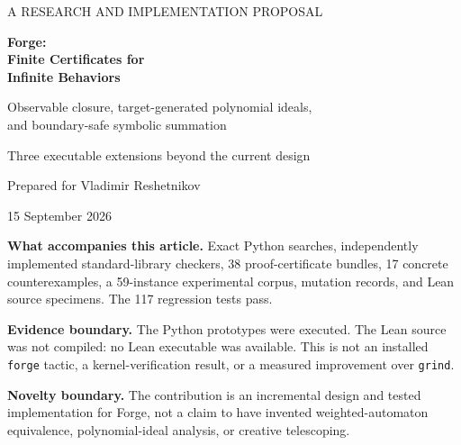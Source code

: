 \documentclass[11pt,a4paper]{article}
\newcommand{\code}[1]{\texttt{\small #1}}
\newcommand{\forge}{\texttt{forge}}
\theoremstyle{definition}\newtheorem{definition}[theorem]{Definition}
\theoremstyle{remark}\newtheorem{remark}[theorem]{Remark}
\begin{document}
\begin{titlepage}
\vspace*{18mm}
{\Large\sffamily\color{ink} A RESEARCH AND IMPLEMENTATION PROPOSAL}\par
\vspace{13mm}
{\Huge\bfseries\color{ink} Forge:\\[3mm] Finite Certificates for\\[3mm] Infinite Behaviors}\par
\vspace{9mm}
{\LARGE Observable closure, target-generated polynomial ideals,\\[2mm]
 and boundary-safe symbolic summation}\par
\vspace{13mm}
{\large Three executable extensions beyond the current design}\par
\vspace{11mm}
Prepared for Vladimir Reshetnikov\par
15 September 2026\par
\vfill
\begin{minipage}{0.96\linewidth}
\textbf{What accompanies this article.} Exact Python searches, independently
implemented standard-library checkers, 38 proof-certificate bundles, 17 concrete
counterexamples, a 59-instance experimental corpus, mutation records, and Lean
source specimens. The 117 regression tests pass.\par\medskip
\textbf{Evidence boundary.} The Python prototypes were executed. The Lean source
was not compiled: no Lean executable was available. This is not an installed
\forge{} tactic, a kernel-verification result, or a measured improvement over
\code{grind}.\par\medskip
\textbf{Novelty boundary.} The contribution is an incremental design and tested
implementation for Forge, not a claim to have invented weighted-automaton
equivalence, polynomial-ideal analysis, or creative telescoping.
\end{minipage}
\end{titlepage}
\end{document}
